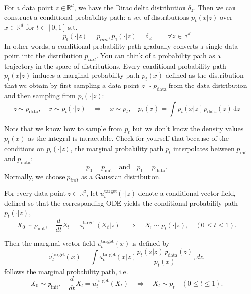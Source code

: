 For a data point $z\in \mathbb{R}^d$, we have the Dirac delta distribution $\delta_z$. Then we can construct a conditional probability path: a set of distributions $p_t(x|z)$ over $x\in \mathbb{R}^d$ for $t\in [0,1]$ s.t.
\begin{equation}
    p_0(\cdot|z ) = p_{init}, p_1(\cdot|z ) = \delta_z,\qquad \forall z\in \mathbb{R}^d 
\end{equation}
In other words, a conditional probability path gradually converts a single data point into the distribution $p_{init}$. You can think of a probability path as a trajectory in the space of distributions. Every conditional probability path $p_t(x|z)$ induces a marginal probability path $p_t(x)$ defined as the distribution that we obtain by first sampling a data point $z \sim p_{\text{data}}$ from the data distribution and then sampling from $p_t(\cdot | z)$:
\begin{equation}
z \sim p_{\text{data}}, \quad x \sim p_t(\cdot | z)
\quad \Rightarrow \quad x \sim p_t,\quad 
p_t(x) = \int p_t(x|z) p_{\text{data}}(z) \, \mathrm{d}z
\end{equation}

Note that we know how to sample from $p_t$ but we don't know the density values $p_t(x)$ as the integral is intractable. Check for yourself that because of the conditions on $p_t(\cdot | z)$, the marginal probability path $p_t$ interpolates between $p_{\text{init}}$ and $p_{\text{data}}$:
\begin{equation}
    p_0 = p_{\text{init}} \quad \text{and} \quad p_1 = p_{\text{data}}.
\end{equation}
Normally, we choose $p_{init}$ as a Gaussian distribution.

For every data point $z \in \mathbb{R}^d$, let $u_t^{\text{target}}(\cdot | z)$ denote a conditional vector field, defined so that the corresponding ODE yields the conditional probability path $p_t(\cdot | z)$,
\begin{equation}
    X_0 \sim p_{\text{init}}, \quad \frac{d}{dt} X_t = u_t^{\text{target}}(X_t | z) 
    \quad \Rightarrow \quad X_t \sim p_t(\cdot | z), \quad (0 \leq t \leq 1).
\end{equation}

Then the marginal vector field $u_t^{\text{target}}(x)$ is defined by
\begin{equation}
    u_t^{\text{target}}(x) = \int u_t^{\text{target}}(x | z) \frac{p_t(x | z) \, p_{\text{data}}(z)}{p_t(x)},dz.
\end{equation}
follows the marginal probability path, i.e.
\begin{equation}
    X_0 \sim p_{\text{init}}, \quad \frac{d}{dt} X_t = u_t^{\text{target}}(X_t) 
    \quad \Rightarrow \quad X_t \sim p_t \quad (0 \leq t \leq 1).
\end{equation}

